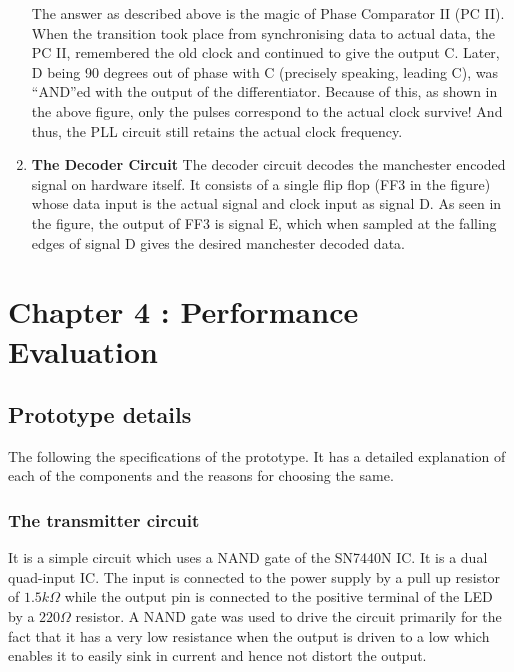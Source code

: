 \documentclass{article}
\begin{document}
\begin{enumerate}[label=(\Alph*)]
The answer as described above is the magic of Phase Comparator II (PC II). When the transition took place from synchronising data to actual data, the PC II, remembered the old clock and continued to give the output C. Later, D being 90 degrees out of phase with C (precisely speaking, leading C), was “AND”ed with the output of the differentiator. Because of this, as shown in the above figure, only the pulses correspond to the actual clock survive! And thus, the PLL circuit still retains the actual clock frequency.    

\item \textbf{The Decoder Circuit}
  The decoder circuit decodes the manchester encoded signal on hardware itself. It consists of a single flip flop (FF3 in the figure) whose data input is the actual signal and clock input as signal D. As seen in the figure, the output of FF3 is signal E, which when sampled at the falling edges of signal D gives the desired manchester decoded data. 
  
\end{enumerate}

\section{Chapter 4 : Performance Evaluation}
\subsection{Prototype details}
The following the specifications of the prototype. It has a detailed explanation of each of the components and the reasons for choosing the same.

\subsubsection{The transmitter circuit}
It is a simple circuit which uses a NAND gate of the SN7440N IC. It is a dual quad-input IC. The input is connected to the power supply by a pull up resistor of $1.5k \Omega$ while the output pin is connected to the positive terminal of the LED by a $220 \Omega $ resistor. A NAND gate was used to drive the circuit primarily for the fact that it has a very low resistance when the output is driven to a low which enables it to easily sink in current and hence not distort the output. 
\end{document}
